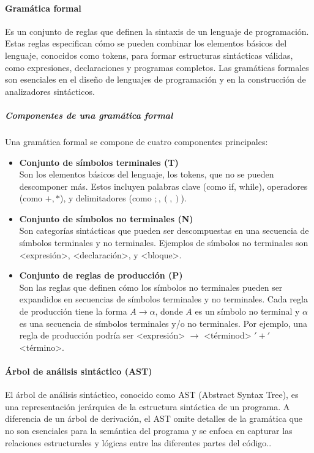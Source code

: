 \paragraph{Gramática formal}

Es un conjunto de reglas que definen la sintaxis de un lenguaje de programación. Estas reglas especifican cómo se pueden combinar los elementos básicos del lenguaje, conocidos como tokens, para formar estructuras sintácticas válidas, como expresiones, declaraciones y programas completos. Las gramáticas formales son esenciales en el diseño de lenguajes de programación y en la construcción de analizadores sintácticos. \parencite{OrtínSoler2004}

\subparagraph{Componentes de una gramática formal}

Una gramática formal se compone de cuatro componentes principales:

\begin{itemize}
  \item \textbf{Conjunto de símbolos terminales (T)} \\
  Son los elementos básicos del lenguaje, los tokens, que no se pueden descomponer más. Estos incluyen palabras clave (como if, while), operadores (como $+, *$), y delimitadores (como $;, (, )$).
  \item \textbf{Conjunto de símbolos no terminales (N)} \\
  Son categorías sintácticas que pueden ser descompuestas en una secuencia de símbolos terminales y no terminales. Ejemplos de símbolos no terminales son <expresión>, <declaración>, y <bloque>.
  \item \textbf{Conjunto de reglas de producción (P)} \\
  Son las reglas que definen cómo los símbolos no terminales pueden ser expandidos en secuencias de símbolos terminales y no terminales. Cada regla de producción tiene la forma $A \rightarrow \alpha$, donde $A$ es un símbolo no terminal y $\alpha$ es una secuencia de símbolos terminales y/o no terminales. Por ejemplo, una regla de producción podría ser <expresión> $\rightarrow$ <términod> $'+'$ <término>.
\end{itemize}

\paragraph{Árbol de análisis sintáctico (AST)}

El árbol de análisis sintáctico, conocido como AST (Abstract Syntax Tree), es una representación jerárquica de la estructura sintáctica de un programa. A diferencia de un árbol de derivación, el AST omite detalles de la gramática que no son esenciales para la semántica del programa y se enfoca en capturar las relaciones estructurales y lógicas entre las diferentes partes del código.. \parencite{Jeffery2021}

